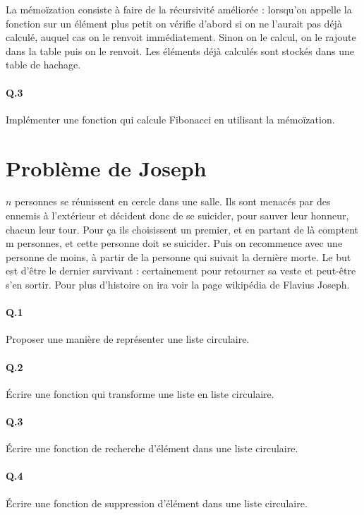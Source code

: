 \documentclass[10pt,a4paper]{article}
\begin{document}
La mémoïzation consiste à faire de la récursivité améliorée : lorsqu'on appelle la fonction sur un élément plus petit on vérifie d'abord si on ne l'aurait pas déjà calculé, auquel cas on le renvoit immédiatement. Sinon on le calcul, on le rajoute dans la table puis on le renvoit. Les éléments déjà calculés sont stockés dans une table de hachage.

\paragraph{Q.3} Implémenter une fonction qui calcule Fibonacci en utilisant la mémoïzation.
 

\section{Problème de Joseph}
$n$ personnes se réunissent en cercle dans une salle. Ils sont menacés par des ennemis à l'extérieur et décident donc de se suicider, pour sauver leur honneur, chacun leur tour. Pour ça ils choisissent un premier, et en partant de là comptent m personnes, et cette personne doit se suicider. Puis on recommence avec une personne de moins, à partir de la personne qui suivait la dernière morte. Le but est d'être le dernier survivant : certainement pour retourner sa veste et peut-être s'en sortir. Pour plus d'histoire on ira voir la page wikipédia de Flavius Joseph.

\paragraph{Q.1} Proposer une manière de représenter une liste circulaire. 

\paragraph{Q.2} Écrire une fonction qui transforme une liste en liste circulaire.

\paragraph{Q.3} Écrire une fonction de recherche d'élément dans une liste circulaire.

\paragraph{Q.4} Écrire une fonction de suppression d'élément dans une liste circulaire.
\end{document}
